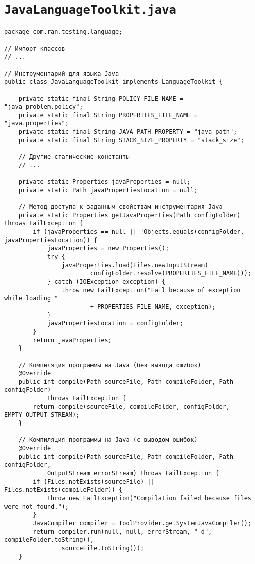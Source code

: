 \section*{\texttt{JavaLanguageToolkit.java}}
\begin{verbatim}
package com.ran.testing.language;

// Импорт классов
// ...

// Инструментарий для языка Java
public class JavaLanguageToolkit implements LanguageToolkit {
    
    private static final String POLICY_FILE_NAME = "java_problem.policy";
    private static final String PROPERTIES_FILE_NAME = "java.properties";
    private static final String JAVA_PATH_PROPERTY = "java_path";
    private static final String STACK_SIZE_PROPERTY = "stack_size";
    
    // Другие статические константы
    // ...
    
    private static Properties javaProperties = null;
    private static Path javaPropertiesLocation = null;
    
    // Метод доступа к заданным свойствам инструментария Java
    private static Properties getJavaProperties(Path configFolder) throws FailException {
        if (javaProperties == null || !Objects.equals(configFolder, javaPropertiesLocation)) {
            javaProperties = new Properties();
            try {
                javaProperties.load(Files.newInputStream(
                        configFolder.resolve(PROPERTIES_FILE_NAME)));
            } catch (IOException exception) {
                throw new FailException("Fail because of exception while loading "
                        + PROPERTIES_FILE_NAME, exception);
            }
            javaPropertiesLocation = configFolder;
        }
        return javaProperties;
    }
    
    // Компиляция программы на Java (без вывода ошибок)
    @Override
    public int compile(Path sourceFile, Path compileFolder, Path configFolder)
            throws FailException {
        return compile(sourceFile, compileFolder, configFolder, EMPTY_OUTPUT_STREAM);
    }

    // Компиляция программы на Java (с выводом ошибок)
    @Override
    public int compile(Path sourceFile, Path compileFolder, Path configFolder,
            OutputStream errorStream) throws FailException {
        if (Files.notExists(sourceFile) || Files.notExists(compileFolder)) {
            throw new FailException("Compilation failed because files were not found.");
        }
        JavaCompiler compiler = ToolProvider.getSystemJavaCompiler();
        return compiler.run(null, null, errorStream, "-d", compileFolder.toString(),
                sourceFile.toString());
    }


\end{verbatim}
